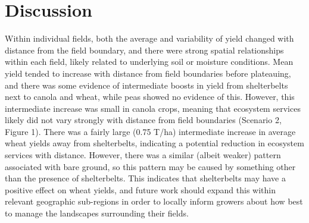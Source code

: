 \documentclass[]{elsarticle} %
\begin{document}
\hypertarget{discussion}{%
\section{Discussion}\label{discussion}}

Within individual fields, both the average and variability of yield changed with distance from the field boundary, and there were strong spatial relationships within each field, likely related to underlying soil or moisture conditions.
Mean yield tended to increase with distance from field boundaries before plateauing, and there was some evidence of intermediate boosts in yield from shelterbelts next to canola and wheat, while peas showed no evidence of this.
However, this intermediate increase was small in canola crops, meaning that ecosystem services likely did not vary strongly with distance from field boundaries (Scenario 2, Figure 1).
There was a fairly large (0.75 T/ha) intermediate increase in average wheat yields away from shelterbelts, indicating a potential reduction in ecosystem services with distance.
However, there was a similar (albeit weaker) pattern associated with bare ground, so this pattern may be caused by something other than the presence of shelterbelts.
This indicates that shelterbelts may have a positive effect on wheat yields, and future work should expand this within relevant geographic sub-regions in order to locally inform growers about how best to manage the landscapes surrounding their fields.
\end{document}

